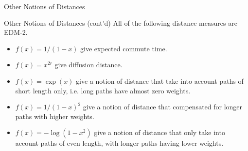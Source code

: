 \documentclass[professionalfonts,hyperref={pdfpagelabels=false,colorlinks=true,linkcolor=red}]{beamer}
\begin{document}
\begin{frame}{Other Notions of Distances}
\end{frame}
\begin{frame}{Other Notions of Distances (cont'd)}
  All of the following distance measures are EDM-2. 
  \begin{itemize}[<+->]
  \item $f(x) = 1/(1-x)$ give expected commute time.
  \item $f(x) = x^{2r}$ give diffusion distance.
  \item $f(x) = \exp(x)$ give a notion of distance that take into
    account paths of short length only, i.e. long paths have almost
    zero weights.
  \item $f(x) = 1/(1-x)^2$ give a notion of distance that compensated
    for longer paths with higher weights.
  \item $f(x) = - \log{(1-x^2)}$ give a notion of distance that only
    take into account paths of even length, with longer paths having
    lower weights.
  \end{itemize}
\end{frame}
\end{document}
